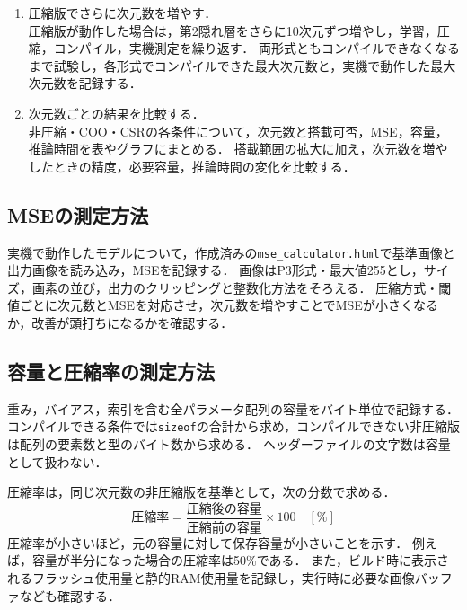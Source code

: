 \documentclass[a4paper,11pt]{article}
\begin{document}
\begin{enumerate}[label=\arabic*.,leftmargin=*,itemsep=6pt]
  \item 圧縮版でさらに次元数を増やす．\\
  圧縮版が動作した場合は，第2隠れ層をさらに10次元ずつ増やし，学習，圧縮，コンパイル，実機測定を繰り返す．
  両形式ともコンパイルできなくなるまで試験し，各形式でコンパイルできた最大次元数と，実機で動作した最大次元数を記録する．

  \item 次元数ごとの結果を比較する．\\
  非圧縮・COO・CSRの各条件について，次元数と搭載可否，MSE，容量，推論時間を表やグラフにまとめる．
  搭載範囲の拡大に加え，次元数を増やしたときの精度，必要容量，推論時間の変化を比較する．
\end{enumerate}



\subsection{MSEの測定方法}
実機で動作したモデルについて，作成済みの\texttt{mse\_calculator.html}で基準画像と出力画像を読み込み，MSEを記録する．
画像はP3形式・最大値255とし，サイズ，画素の並び，出力のクリッピングと整数化方法をそろえる．
圧縮方式・閾値ごとに次元数とMSEを対応させ，次元数を増やすことでMSEが小さくなるか，改善が頭打ちになるかを確認する．

\subsection{容量と圧縮率の測定方法}
重み，バイアス，索引を含む全パラメータ配列の容量をバイト単位で記録する．
コンパイルできる条件では\texttt{sizeof}の合計から求め，コンパイルできない非圧縮版は配列の要素数と型のバイト数から求める．
ヘッダーファイルの文字数は容量として扱わない．

圧縮率は，同じ次元数の非圧縮版を基準として，次の分数で求める．
\[
  \text{圧縮率}=\frac{\text{圧縮後の容量}}{\text{圧縮前の容量}}\times100\quad[\%]
\]
圧縮率が小さいほど，元の容量に対して保存容量が小さいことを示す．
例えば，容量が半分になった場合の圧縮率は50\%である．
また，ビルド時に表示されるフラッシュ使用量と静的RAM使用量を記録し，実行時に必要な画像バッファなども確認する．
\end{document}
